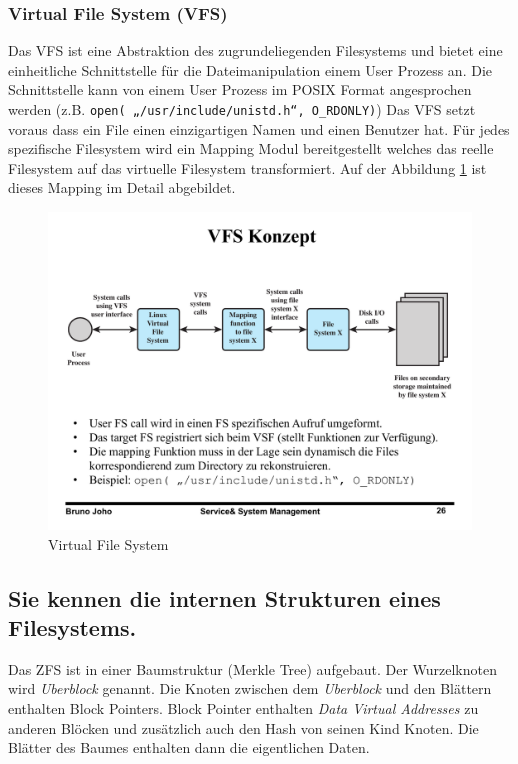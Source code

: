 
\subsubsection{Virtual File System (VFS)}

Das VFS ist eine Abstraktion des zugrundeliegenden Filesystems und bietet eine einheitliche Schnittstelle für die Dateimanipulation einem User Prozess an. Die Schnittstelle kann von einem User Prozess im POSIX Format angesprochen werden (z.B. \texttt{open( „/usr/include/unistd.h“, O\_RDONLY)}) Das VFS setzt voraus dass ein File einen einzigartigen Namen und einen Benutzer hat. Für jedes spezifische Filesystem wird ein Mapping Modul bereitgestellt welches das reelle Filesystem auf das virtuelle Filesystem transformiert. Auf der Abbildung \ref{fig:virtual-file-system} ist dieses Mapping im Detail abgebildet.

\begin{figure}
\centering
\includegraphics[width=0.7\linewidth]{fig/virtual-file-system}
\caption{Virtual File System}
\label{fig:virtual-file-system}
\end{figure}

\subsection{Sie kennen die internen Strukturen eines Filesystems.}

Das ZFS ist in einer Baumstruktur (Merkle Tree) aufgebaut. Der Wurzelknoten wird \emph{Uberblock} genannt. Die Knoten zwischen dem \emph{Uberblock} und den Blättern enthalten Block Pointers. Block Pointer enthalten \emph{Data Virtual Addresses} zu anderen Blöcken und zusätzlich auch den Hash von seinen Kind Knoten. Die Blätter des Baumes enthalten dann die eigentlichen Daten.

